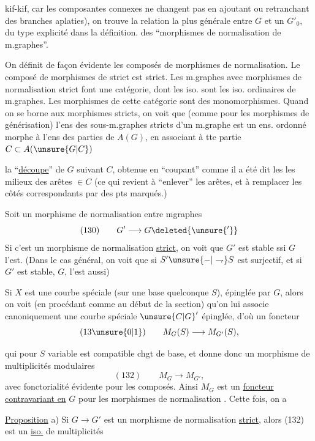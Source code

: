 kif-kif, car les composantes connexes ne changent pas en ajoutant ou retranchant des branches aplaties), on trouve la relation la plus générale entre $G$ et un $G'_0$, du type explicité dans la définition. des ``morphismes de normalisation de m.graphes''.

On définit de façon évidente les composés de morphismes de normalisation. Le composé de morphismes de  strict est strict. Les m.graphes avec morphismes de normalisation strict font une catégorie, dont les iso. sont les iso. ordinaires de m.graphes. Les morphismes de cette catégorie sont des monomorphismes. Quand on se borne aux morphismes  stricts, on voit que (comme pour les morphismes de générisation) l'ens des sous-m.graphes stricts d'un m.graphe  est un ens. ordonné morphe à l'ens des parties de $A(G)$, en associant à tte partie $C\subset A(\unsure{G|C})$

la ``\uline{découpe}'' de $G$ suivant $C$, obtenue en ``coupant'' comme il a été dit les les milieux des arêtes $\in C$ (ce qui revient à ``enlever'' les arêtes, et à remplacer les côtés correspondants par des pts marqués.)

Soit un morphisme de normalisation entre mgraphes
\[
(130)\qquad G'\longrightarrow G\deleted{\unsure{'}}
\]
Si c'est un morphisme de normalisation \uline{strict}, on voit que $G'$ est stable ssi $G$ l'est. (Dans le cas général, on voit que si $S'\unsure{-|\rightharpoondown}S$ est surjectif, et si $G'$ est stable, $G$, l'est aussi)

 Si $X$ est une courbe spéciale (sur une base quelconque $S$), épinglée par $G$, alors on voit (en procédant comme au début de la section) qu'on lui associe canoniquement une courbe spéciale $\unsure{C|G}'$ épinglée, d'où un foncteur
\[
(13\unsure{0|1})\qquad M_G(S)\longrightarrow M_{G'}(S),
\]

qui pour $S$ variable est compatible  chgt de base, et donne donc un morphisme de multiplicités modulaires 
\[
(132)\qquad M_G\longrightarrow M_{G'},
\]
avec fonctorialité évidente pour les composés. Ainsi $M_G$ est un \uline{foncteur contravariant en} $G$ pour les morphismes de normalisation . Cette fois, on a

\uline{Proposition} a) Si $G\longrightarrow G'$ est un morphisme de normalisation \uline{strict}, alors (132) est un \uline{iso.} de multiplicités


